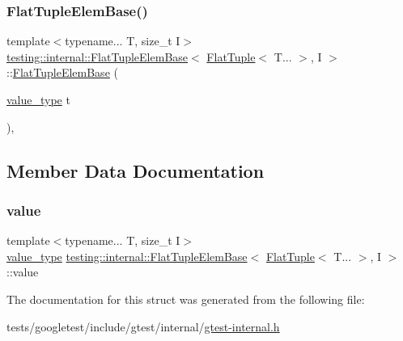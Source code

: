\subsubsection{\texorpdfstring{Flat\+Tuple\+Elem\+Base()}{FlatTupleElemBase()}\hspace{0.1cm}{\footnotesize\ttfamily [2/2]}}
{\footnotesize\ttfamily template$<$typename... T, size\+\_\+t I$>$ \\
\hyperlink{structtesting_1_1internal_1_1FlatTupleElemBase}{testing\+::internal\+::\+Flat\+Tuple\+Elem\+Base}$<$ \hyperlink{classtesting_1_1internal_1_1FlatTuple}{Flat\+Tuple}$<$ T... $>$, I $>$\+::\hyperlink{structtesting_1_1internal_1_1FlatTupleElemBase}{Flat\+Tuple\+Elem\+Base} (\begin{DoxyParamCaption}\item[{\hyperlink{structtesting_1_1internal_1_1FlatTupleElemBase_3_01FlatTuple_3_01T_8_8_8_01_4_00_01I_01_4_a6b87a445f87724f9363b348e6c697766}{value\+\_\+type}}]{t }\end{DoxyParamCaption})\hspace{0.3cm}{\ttfamily [inline]}, {\ttfamily [explicit]}}



\subsection{Member Data Documentation}
\mbox{\label{structtesting_1_1internal_1_1FlatTupleElemBase_3_01FlatTuple_3_01T_8_8_8_01_4_00_01I_01_4_ac175518e7807c0b49c0ba8c1c78269ec}} 
\subsubsection{\texorpdfstring{value}{value}}
{\footnotesize\ttfamily template$<$typename... T, size\+\_\+t I$>$ \\
\hyperlink{structtesting_1_1internal_1_1FlatTupleElemBase_3_01FlatTuple_3_01T_8_8_8_01_4_00_01I_01_4_a6b87a445f87724f9363b348e6c697766}{value\+\_\+type} \hyperlink{structtesting_1_1internal_1_1FlatTupleElemBase}{testing\+::internal\+::\+Flat\+Tuple\+Elem\+Base}$<$ \hyperlink{classtesting_1_1internal_1_1FlatTuple}{Flat\+Tuple}$<$ T... $>$, I $>$\+::value}



The documentation for this struct was generated from the following file\+:\begin{DoxyCompactItemize}
\item 
tests/googletest/include/gtest/internal/\hyperlink{gtest-internal_8h}{gtest-\/internal.\+h}\end{DoxyCompactItemize}
